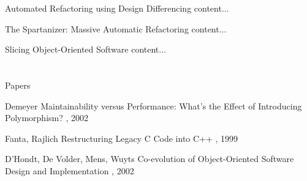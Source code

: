 \documentclass{beamer}
\begin{document}
\begin{frame}{Automated Refactoring using Design Differencing}
  content...
\end{frame}

\begin{frame}{The Spartanizer: Massive Automatic Refactoring}
  content...
\end{frame}

\begin{frame}{Slicing Object-Oriented Software}
  content...
\end{frame}

%  
%


\appendix
\section*{\appendixname}

\begin{frame}{Papers}
  \begin{thebibliography}{10}
    \beamertemplatearticlebibitems
    
      Demeyer
      \newblock Maintainability versus Performance: What's the Effect of Introducing Polymorphism?
      , 2002
    
      Fanta, Rajlich
      \newblock Restructuring Legacy C Code into C++
      , 1999
    
      D'Hondt, De Volder, Mens, Wuyts
      \newblock Co-evolution of Object-Oriented Software Design and Implementation
      , 2002
  \end{thebibliography}
\end{frame}
\end{document}
